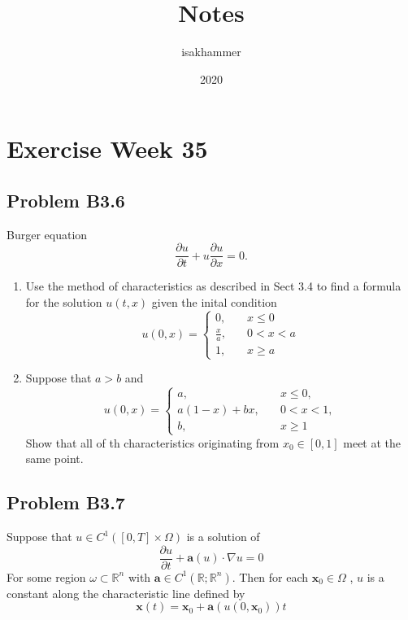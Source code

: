 \documentclass{article}
\title{Notes}
\author{isakhammer }
\date{2020}
\theoremstyle{remark}
\begin{document}
\maketitle
\tableofcontents
\newpage

\newpage
\section{Exercise Week 35}%
\label{sec:exercise_1}

\subsection{Problem B3.6}%
\label{sub:problem_b3_}

Burger equation 
\begin{equation}
\label{eq:burger}
\frac{\partial u}{\partial t}  + u \frac{\partial u}{\partial x} = 0
.\end{equation}

\begin{enumerate}[label=(\alph*)]
  \item Use the method of characteristics as described in Sect 3.4 to find a formula for the solution $u\left( t,x \right)$ given the inital condition \[
  u\left( 0, x \right) = \begin{cases}
    0,  &  \quad x\le 0\\
    \frac{x}{a} ,  &  \quad  0 < x < a \\
    1, &  \quad    x\ge a
  \end{cases}
  \] 
 \item Suppose that $a > b$ and \[
 u\left( 0,x \right) = \begin{cases}
   a,  &  \quad  x\le 0, \\
   a\left( 1-x \right) + bx ,  &  \quad    0 < x < 1, \\
   b,  &  \quad  x\ge 1 
 \end{cases}
 \] 
 Show that all of th characteristics originating from $x_{0} \in  \left[ 0,1 \right]$ meet at the same point.
\end{enumerate}


\subsection{Problem B3.7}%
\label{sub:problem_1}

\begin{theorem}
  \label{th1}
  Suppose that $u \in  C^{1} \left( \left[ 0,T \right] \times  \Omega   \right)$ is a solution of \[
  \frac{\partial u}{\partial t}  + \mathbf{a}\left( u \right) \cdot  \nabla u = 0
  \] 
  For some region $\omega  \subset  \mathbb{R}  ^{n}$ with $\mathbf{a} \in  C^{1} \left( \mathbb{R} ; \mathbb{R} ^{n} \right)$.  Then for each $\mathbf{x}_{0} \in  \Omega $ , $u$ is a constant along the characteristic line defined by \[
  \mathbf{x}\left( t \right) = \mathbf{x}_{0} + \mathbf{a} \left( u\left( 0, \mathbf{x}_{0} \right) \right)t
  \] 
\end{theorem}
\end{document}
